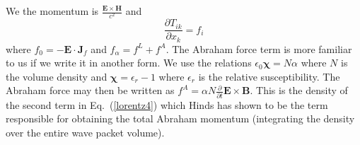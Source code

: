 \documentclass[twocolumn,english,pra,aps,superscriptaddress,floatfix]{revtex4-1}
\begin{document}
We the momentum is $\frac{\mathbf{E}\times\mathbf{H}}{c^2}$ and
\begin{equation}
\frac{\partial T_{ik}}{\partial x_k}=f_i
\end{equation}
where $f_0=-\mathbf{E}\cdot\mathbf{J}_f$ and $f_{\alpha}=f^L + f^A$.  The Abraham force term is more familiar to us if we write it in another form.  We use the relations $\epsilon_0\mathbf{\chi} = N\alpha$ where $N$ is the volume density and $\mathbf{\chi}=\epsilon_r-1$ where $\epsilon_r$ is the relative susceptibility.  The Abraham force may then be written as $f^A=\alpha N\frac{\partial}{\partial t}\mathbf{E}\times\mathbf{B}$.  This is the density of the second term in Eq.\ (\ref{lorentz4}) which Hinds has shown to be the term responsible for obtaining the total Abraham momentum (integrating the density over the entire wave packet volume).  
\end{document}
